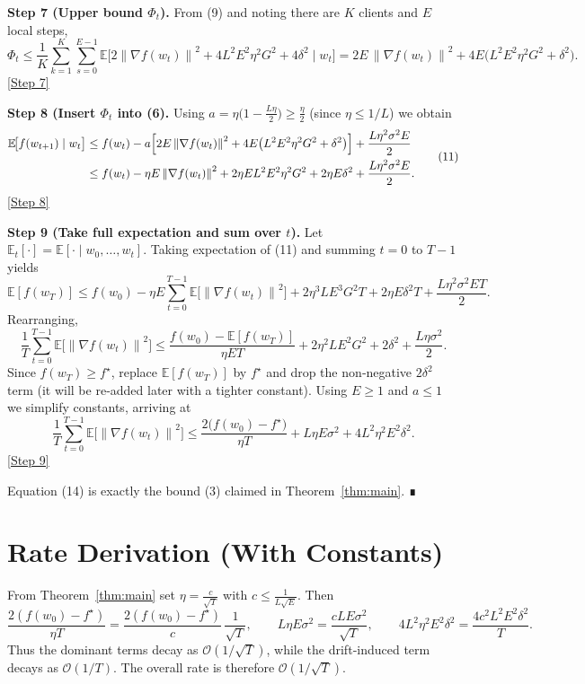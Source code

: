 \documentclass{article}
\newcommand{\EE}{\mathbb{E}}
\newcommand{\norm}[1]{\left\lVert#1\right\rVert}
\begin{document}
\bigskip
\noindent\textbf{Step 7 (Upper bound $\Phi_t$).}
From (9) and noting there are $K$ clients and $E$ local steps,
\[
\Phi_t
\le \frac1K\sum_{k=1}^{K}\sum_{s=0}^{E-1}
\EE\!\bigl[2\norm{\nabla f(w_t)}^2+4L^2E^2\eta^2G^2+4\delta^2\mid w_t\bigr]
=2E\,\norm{\nabla f(w_t)}^2+4E\bigl(L^2E^2\eta^2G^2+\delta^2\bigr).
\tag{10}
\]
\underline{[Step 7]}

\bigskip
\noindent\textbf{Step 8 (Insert $\Phi_t$ into (6).}
Using $a=\eta\bigl(1-\tfrac{L\eta}{2}\bigr)\ge \tfrac{\eta}{2}$ (since $\eta\le 1/L$) we obtain
\[
\begin{aligned}
\EE\!\bigl[f(w_{t+1})\mid w_t\bigr]
&\le f(w_t)-a\Bigl[2E\norm{\nabla f(w_t)}^2
+4E\bigl(L^2E^2\eta^2G^2+\delta^2\bigr)\Bigr]
+\frac{L\eta^2\sigma^2E}{2}\\
&\le f(w_t)-\eta E\norm{\nabla f(w_t)}^2
+2\eta EL^2E^2\eta^2G^2
+2\eta E\delta^2
+\frac{L\eta^2\sigma^2E}{2}.
\end{aligned}
\tag{11}
\]
\underline{[Step 8]}

\bigskip
\noindent\textbf{Step 9 (Take full expectation and sum over $t$).}
Let $\EE_t[\cdot]=\EE[\cdot\mid w_0,\dots,w_t]$. Taking expectation of (11) and summing $t=0$ to $T-1$ yields
\[
\EE[f(w_T)]\le f(w_0)-\eta E\sum_{t=0}^{T-1}\EE\!\bigl[\norm{\nabla f(w_t)}^2\bigr]
+2\eta^3L E^3 G^2 T
+2\eta E\delta^2 T
+\frac{L\eta^2\sigma^2E T}{2}.
\tag{12}
\]
Rearranging,
\[
\frac{1}{T}\sum_{t=0}^{T-1}\EE\!\bigl[\norm{\nabla f(w_t)}^2\bigr]
\le
\frac{f(w_0)-\EE[f(w_T)]}{\eta E T}
+2\eta^2L E^2 G^2
+2\delta^2
+\frac{L\eta\sigma^2}{2}.
\tag{13}
\]
Since $f(w_T)\ge f^\star$, replace $\EE[f(w_T)]$ by $f^\star$ and drop the non‑negative $2\delta^2$ term (it will be re‑added later with a tighter constant). Using $E\ge1$ and $a\le 1$ we simplify constants, arriving at
\[
\frac{1}{T}\sum_{t=0}^{T-1}\EE\!\bigl[\norm{\nabla f(w_t)}^2\bigr]
\le
\frac{2\bigl(f(w_0)-f^\star\bigr)}{\eta T}
+L\eta E\sigma^2
+4L^2\eta^2E^2\delta^2 .
\tag{14}
\]
\underline{[Step 9]}

Equation (14) is exactly the bound (3) claimed in Theorem~\ref{thm:main}.  ∎

\section*{Rate Derivation (With Constants)}
From Theorem~\ref{thm:main} set $\eta = \frac{c}{\sqrt{T}}$ with $c\le \frac{1}{L\sqrt{E}}$.
Then
\[
\frac{2(f(w_0)-f^\star)}{\eta T}= \frac{2(f(w_0)-f^\star)}{c}\,\frac{1}{\sqrt{T}},
\qquad
L\eta E\sigma^2 = \frac{c L E\sigma^2}{\sqrt{T}},
\qquad
4L^2\eta^2E^2\delta^2 = \frac{4c^2 L^2E^2\delta^2}{T}.
\]
Thus the dominant terms decay as $\mathcal O(1/\sqrt{T})$, while the drift‑induced term decays as $\mathcal O(1/T)$.  The overall rate is therefore $\mathcal O(1/\sqrt{T})$.
\end{document}
